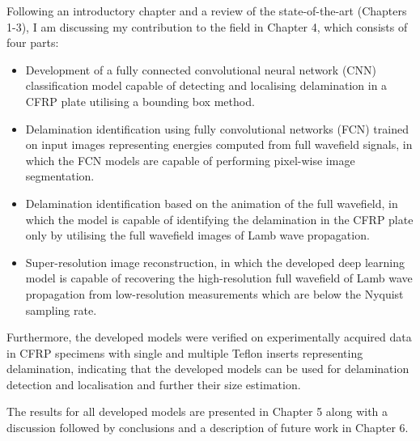 {	Following an introductory chapter and a review of the state-of-the-art (Chapters 1-3), I am discussing my contribution to the field in Chapter 4, which consists of four parts:
	\begin{itemize}
		\item Development of a fully connected convolutional neural network (CNN) classifica\-tion model capable of detecting and localising delamination in a CFRP plate utilising a bounding box method.
		\item Delamination identification using fully convolutional networks (FCN) trained on input images representing energies computed from full wavefield signals, in which the FCN models are capable of performing pixel-wise image segmentation.
		\item Delamination identification based on the animation of the full wavefield, in which the model is capable of identifying the delamination in the CFRP plate only by utilising the full wavefield images of Lamb wave propagation.
		\item Super-resolution image reconstruction, in which the developed deep learning model is capable of recovering the high-resolution full wavefield of Lamb wave propagation from low-resolution measurements which are below the Nyquist samp\-ling rate.
	\end{itemize}
	Furthermore, the developed models were verified on experimentally acquired data in CFRP specimens with single and multiple Teflon inserts representing delamination, indicating that the developed models can be used for
	delamination detection and localisation and further their size estimation.
	
	The results for all developed models are presented in Chapter 5 along with a discussion followed by conclusions and a description of future work in Chapter 6.
}

